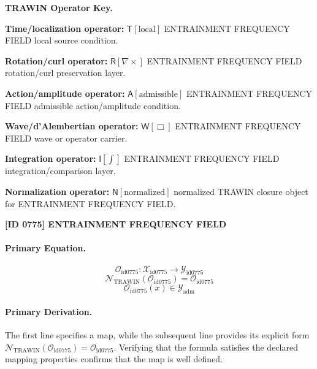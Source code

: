\par\vspace{0.45\baselineskip}
\noindent\begin{minipage}[t]{\linewidth}
\begingroup
\small
\raggedright
\textbf{TRAWIN Operator Key.}\par
\noindent\textbf{Time/localization operator:} $\mathsf{T}\!\left[\mathrm{local}\right]$ ENTRAINMENT FREQUENCY FIELD local source condition.\par
\noindent\textbf{Rotation/curl operator:} $\mathsf{R}\!\left[\nabla\times\right]$ ENTRAINMENT FREQUENCY FIELD rotation/curl preservation layer.\par
\noindent\textbf{Action/amplitude operator:} $\mathsf{A}\!\left[\mathrm{admissible}\right]$ ENTRAINMENT FREQUENCY FIELD admissible action/amplitude condition.\par
\noindent\textbf{Wave/d'Alembertian operator:} $\mathsf{W}\!\left[\Box\right]$ ENTRAINMENT FREQUENCY FIELD wave or operator carrier.\par
\noindent\textbf{Integration operator:} $\mathsf{I}\!\left[\int\right]$ ENTRAINMENT FREQUENCY FIELD integration/comparison layer.\par
\noindent\textbf{Normalization operator:} $\mathsf{N}\!\left[\mathrm{normalized}\right]$ normalized TRAWIN closure object for ENTRAINMENT FREQUENCY FIELD.\par
\endgroup
\end{minipage}

\clearpage
\noindent\textbf{[ID 0775] ENTRAINMENT FREQUENCY FIELD}\par
\vspace{0.35em}
\paragraph{Primary Equation.}
\[
\mathcal{O}_{\mathrm{id0775}}:\mathcal{X}_{\mathrm{id0775}}\longrightarrow\mathcal{Y}_{\mathrm{id0775}}
\]
\[
\mathcal{N}_{\mathrm{TRAWIN}}(\mathcal{O}_{\mathrm{id0775}})=\mathcal{O}_{\mathrm{id0775}}
\]
\[
\mathcal{O}_{\mathrm{id0775}}(x)\in\mathcal{Y}_{\mathrm{adm}}
\]

\paragraph{Primary Derivation.}
The first line specifies a map, while the subsequent line provides its explicit form \( \mathcal{N}_{\mathrm{TRAWIN}}(\mathcal{O}_{\mathrm{id0775}})=\mathcal{O}_{\mathrm{id0775}} \). Verifying that the formula satisfies the declared mapping properties confirms that the map is well defined.
